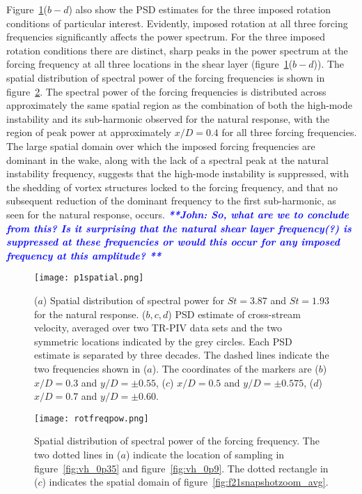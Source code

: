 \documentclass[3p]{elsarticle}
\newcommand{\js}[1]{{\textcolor{blue}{{\bf{\it{ **John: #1 **}}}}}}
\begin{document}
Figure~\ref{fig:p1spatial}($b-d$) also show the PSD estimates for the three imposed rotation conditions of particular interest. Evidently, imposed rotation at all three forcing frequencies significantly affects the power spectrum. For the three imposed rotation conditions there are distinct, sharp
peaks in the power spectrum at the forcing frequency at all three locations in the shear layer (figure~\ref{fig:p1spatial}($b-d$)). The spatial distribution of spectral power
of the forcing frequencies is shown in figure~\ref{fig:rotfreqpow}.
The spectral power of the forcing frequencies is distributed across
approximately the same spatial region as the combination of both the
high-mode instability and its sub-harmonic observed for the natural response, with the region of peak power at
approximately $x/D=0.4$ for all three forcing frequencies. The large spatial domain over which the
imposed forcing frequencies are dominant in the wake, along with the lack of a spectral peak at the natural instability frequency, suggests that
the high-mode instability is suppressed, with the shedding of vortex structures locked to the forcing frequency, and that no
subsequent reduction of the dominant frequency to the first
sub-harmonic, as seen for the natural response, occurs. \js{So, what are we to conclude from this? Is it surprising that the 
natural shear layer frequency(?) is suppressed at these frequencies or would this occur for any imposed frequency at this amplitude?}
%
\begin{figure}
	\centering
	\texttt{[image: p1spatial.png]}
	\caption{($a$) Spatial distribution of spectral power for $St=3.87$ and $St=1.93$ for the natural response. ($b, c, d$) PSD estimate of cross-stream velocity, averaged over two TR-PIV data sets and the two symmetric locations indicated by the grey circles. Each PSD estimate is separated by three decades. The dashed lines indicate the two frequencies shown in ($a$). The coordinates of the markers are ($b$) $x/D=0.3$ and $y/D=\pm 0.55$, ($c$) $x/D=0.5$ and $y/D=\pm 0.575$, ($d$) $x/D=0.7$ and $y/D=\pm 0.60$.}
	\label{fig:p1spatial}
\end{figure}
%
\begin{figure}
	\centering
	\texttt{[image: rotfreqpow.png]}
	\caption{Spatial distribution of spectral power of the forcing
		frequency. The two dotted lines in ($a$)
		indicate the location of sampling in
		figure~\ref{fig:vh_0p35} and figure~\ref{fig:vh_0p9}. The
		dotted rectangle in ($c$) indicates the spatial domain of
		figure~\ref{fig:f21snapshotzoom_avg}.}
	\label{fig:rotfreqpow}
\end{figure}
%
\end{document}
